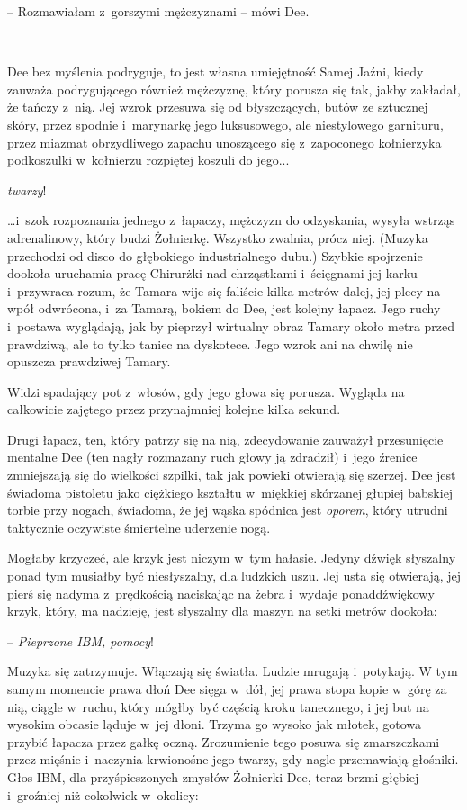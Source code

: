 \documentclass[oneside,polish,11pt,sfheadings]{mwbk}
\begin{document}
-- Rozmawiałam z~gorszymi mężczyznami -- mówi Dee.

~

Dee bez myślenia podryguje, to jest własna umiejętność Samej Jaźni,
kiedy zauważa podrygującego również mężczyznę, który porusza się tak,
jakby zakładał, że tańczy z~nią. Jej wzrok przesuwa się od błyszczących,
butów ze sztucznej skóry, przez spodnie i~marynarkę jego luksusowego,
ale niestylowego garnituru, przez miazmat obrzydliwego zapachu unoszącego
się z~zapoconego kołnierzyka podkoszulki w~kołnierzu rozpiętej koszuli
do jego...

\emph{twarzy}!

\ldots i~szok rozpoznania jednego z~łapaczy, mężczyzn do odzyskania, wysyła
wstrząs adrenalinowy, który budzi Żołnierkę. Wszystko zwalnia, prócz
niej. (Muzyka przechodzi od disco do głębokiego industrialnego dubu.)
Szybkie spojrzenie dookoła uruchamia pracę Chirurżki nad chrząstkami i~ścięgnami jej karku i~przywraca rozum, że Tamara wije się faliście kilka
metrów dalej, jej plecy na wpół odwrócona, i~za Tamarą, bokiem do Dee,
jest kolejny łapacz. Jego ruchy i~postawa wyglądają, jak by pieprzył
wirtualny obraz Tamary około metra przed prawdziwą, ale to tylko taniec
na dyskotece. Jego wzrok ani na chwilę nie opuszcza prawdziwej Tamary.

Widzi spadający pot z~włosów, gdy jego głowa się porusza. Wygląda na
całkowicie zajętego przez przynajmniej kolejne kilka sekund.

Drugi łapacz, ten, który patrzy się na nią, zdecydowanie zauważył
przesunięcie mentalne Dee (ten nagły rozmazany ruch głowy ją zdradził) i~jego źrenice zmniejszają się do wielkości szpilki, tak jak powieki
otwierają się szerzej. Dee jest świadoma pistoletu jako ciężkiego
kształtu w~miękkiej skórzanej głupiej babskiej torbie przy nogach,
świadoma, że jej wąska spódnica jest \emph{oporem}, który utrudni
taktycznie oczywiste śmiertelne uderzenie nogą.

Mogłaby krzyczeć, ale krzyk jest niczym w~tym hałasie. Jedyny dźwięk
słyszalny ponad tym musiałby być niesłyszalny, dla ludzkich uszu. Jej
usta się otwierają, jej pierś się nadyma z~prędkością naciskając na
żebra i~wydaje ponaddźwiękowy krzyk, który, ma nadzieję, jest słyszalny
dla maszyn na setki metrów dookoła: 

-- \emph{Pieprzone IBM, pomocy}!

Muzyka się zatrzymuje. Włączają się światła. Ludzie mrugają i~potykają.
W tym samym momencie prawa dłoń Dee sięga w~dół, jej prawa stopa kopie w~górę za nią, ciągle w~ruchu, który mógłby być częścią kroku tanecznego,
i jej but na wysokim obcasie ląduje w~jej dłoni. Trzyma go wysoko jak
młotek, gotowa przybić łapacza przez gałkę oczną. Zrozumienie tego
posuwa się zmarszczkami przez mięśnie i~naczynia krwionośne jego twarzy,
gdy nagle przemawiają głośniki. Głos IBM, dla przyśpieszonych zmysłów
Żołnierki Dee, teraz brzmi głębiej i~groźniej niż cokolwiek w~okolicy:
\end{document}
